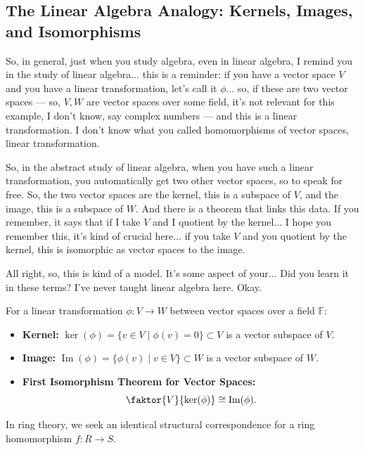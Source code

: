 \subsection{The Linear Algebra Analogy: Kernels, Images, and Isomorphisms}

\begin{speech}[00:18:33 - 00:20:12]
So, in general, just when you study algebra, even in linear algebra, I remind you in the study of linear algebra...  this is a reminder: if you have a vector space $V$ and you have a linear transformation, let's call it $\phi$...  so, if these are two vector spaces --- so, $V, W$ are vector spaces over some field,  it's not relevant for this example, I don't know, say complex numbers --- and this is a linear transformation. I don't know what you called homomorphisms of vector spaces, linear transformation. 

So, in the abstract study of linear algebra, when you have such a linear transformation, you automatically get two other vector spaces, so to speak for free. So, the two vector spaces are the kernel, this is a subspace of $V$, and the image, this is a subspace of $W$.  And there is a theorem that links this data. If you remember, it says that if I take $V$ and I quotient by the kernel... I hope you remember this, it's kind of crucial here... if you take $V$ and you quotient by the kernel, this is isomorphic as vector spaces to the image. 

All right, so, this is kind of a model. It's some aspect of your... Did you learn it in these terms? I've never taught linear algebra here. Okay.
\end{speech}

\begin{overview}
For a linear transformation $\phi \colon V \to W$ between vector spaces over a field $\mathbb{F}$:
\begin{itemize}
    \item \textbf{Kernel:} $\ker(\phi) = \{ v \in V \mid \phi(v) = 0 \} \subset V$ is a vector subspace of $V$.
    \item \textbf{Image:} $\operatorname{Im}(\phi) = \{ \phi(v) \mid v \in V \} \subset W$ is a vector subspace of $W$.
    \item \textbf{First Isomorphism Theorem for Vector Spaces:}
    \[
    \faktor{V}{\ker(\phi)} \cong \operatorname{Im}(\phi).
    \]
\end{itemize}
In ring theory, we seek an identical structural correspondence for a ring homomorphism $f \colon R \to S$.
\end{overview}

